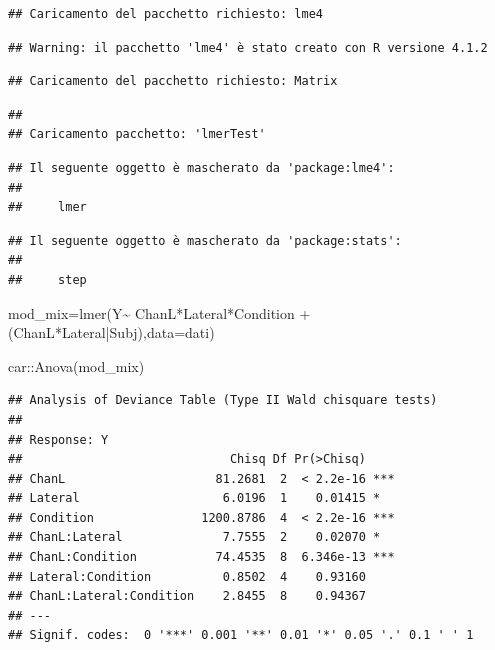 \documentclass[
]{article}
\newenvironment{Shaded}{\begin{snugshade}}{\end{snugshade}}
\newcommand{\AttributeTok}[1]{\textcolor[rgb]{0.77,0.63,0.00}{#1}}
\newcommand{\FunctionTok}[1]{\textcolor[rgb]{0.00,0.00,0.00}{#1}}
\newcommand{\NormalTok}[1]{#1}
\newcommand{\OtherTok}[1]{\textcolor[rgb]{0.56,0.35,0.01}{#1}}
\newcommand{\SpecialCharTok}[1]{\textcolor[rgb]{0.00,0.00,0.00}{#1}}
\begin{document}
\begin{verbatim}
## Caricamento del pacchetto richiesto: lme4
\end{verbatim}

\begin{verbatim}
## Warning: il pacchetto 'lme4' è stato creato con R versione 4.1.2
\end{verbatim}

\begin{verbatim}
## Caricamento del pacchetto richiesto: Matrix
\end{verbatim}

\begin{verbatim}
## 
## Caricamento pacchetto: 'lmerTest'
\end{verbatim}

\begin{verbatim}
## Il seguente oggetto è mascherato da 'package:lme4':
## 
##     lmer
\end{verbatim}

\begin{verbatim}
## Il seguente oggetto è mascherato da 'package:stats':
## 
##     step
\end{verbatim}

\begin{Shaded}
\begin{Highlighting}[]
\NormalTok{mod\_mix}\OtherTok{=}\FunctionTok{lmer}\NormalTok{(Y}\SpecialCharTok{\textasciitilde{}}\NormalTok{ ChanL}\SpecialCharTok{*}\NormalTok{Lateral}\SpecialCharTok{*}\NormalTok{Condition }\SpecialCharTok{+}\NormalTok{(ChanL}\SpecialCharTok{*}\NormalTok{Lateral}\SpecialCharTok{|}\NormalTok{Subj),}\AttributeTok{data=}\NormalTok{dati)}

\NormalTok{car}\SpecialCharTok{::}\FunctionTok{Anova}\NormalTok{(mod\_mix)}
\end{Highlighting}
\end{Shaded}

\begin{verbatim}
## Analysis of Deviance Table (Type II Wald chisquare tests)
## 
## Response: Y
##                             Chisq Df Pr(>Chisq)    
## ChanL                     81.2681  2  < 2.2e-16 ***
## Lateral                    6.0196  1    0.01415 *  
## Condition               1200.8786  4  < 2.2e-16 ***
## ChanL:Lateral              7.7555  2    0.02070 *  
## ChanL:Condition           74.4535  8  6.346e-13 ***
## Lateral:Condition          0.8502  4    0.93160    
## ChanL:Lateral:Condition    2.8455  8    0.94367    
## ---
## Signif. codes:  0 '***' 0.001 '**' 0.01 '*' 0.05 '.' 0.1 ' ' 1
\end{verbatim}
\end{document}
